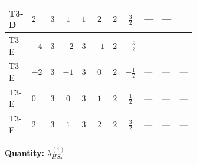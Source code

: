 \documentclass[8pt]{article}
\begin{document}
\begin{landscape}
\begin{longtable}{@{}llcccccc >{\raggedright\arraybackslash}p{0.21\linewidth} >{\raggedright\arraybackslash}p{0.21\linewidth} >{\raggedright\arraybackslash}p{0.21\linewidth}@{}}
\midrule
T3-D & $2$ & $3$ & $1$ & $1$ & $2$ & $2$ & $\frac{3}{2}$ & --- & --- & \scriptsize\adjustbox{max width=\linewidth}{$\begin{gathered} {\lambda_{HS_2}^{(1)}} (4 T_{\nu}^{(2)}+6 \operatorname{Tr}\!\left({Y_d}\,\left({Y_d}\right)^{\dagger}\right)+2 \operatorname{Tr}\!\left({Y_e}\,\left({Y_e}\right)^{\dagger}\right)+6 \operatorname{Tr}\!\left({Y_u}\,\left({Y_u}\right)^{\dagger}\right))\end{gathered}$} \\
\midrule
T3-E & $-4$ & $3$ & $-2$ & $3$ & $-1$ & $2$ & $-\frac{3}{2}$ & --- & --- & --- \\
\midrule
T3-E & $-2$ & $3$ & $-1$ & $3$ & $0$ & $2$ & $-\frac{1}{2}$ & --- & --- & --- \\
\midrule
T3-E & $0$ & $3$ & $0$ & $3$ & $1$ & $2$ & $\frac{1}{2}$ & --- & --- & --- \\
\midrule
T3-E & $2$ & $3$ & $1$ & $3$ & $2$ & $2$ & $\frac{3}{2}$ & --- & --- & --- \\
\midrule
\bottomrule
\end{longtable}
\clearpage
\noindent\textbf{Quantity: }$\lambda_{HS_2}^{(1)}$\par\smallskip

\end{landscape}
\end{document}
